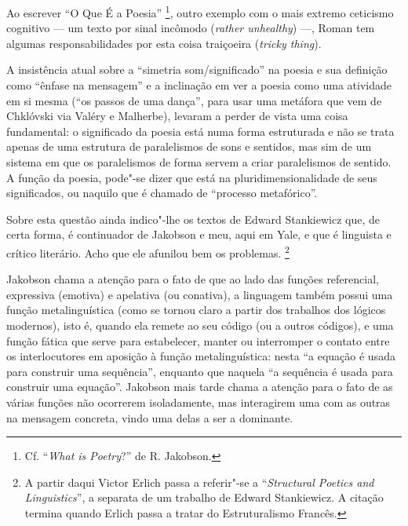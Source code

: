 Ao escrever ``O Que É a Poesia'' \footnote{Cf. ``\emph{What is
  Poetry}?'' de R. Jakobson.}, outro exemplo com o mais extremo
ceticismo cognitivo --- um texto por sinal incômodo (\emph{rather
unhealthy}) ---, Roman tem algumas responsabilidades por esta coisa
traiçoeira (\emph{tricky thing}).

A insistência atual sobre a ``simetria som/significado'' na poesia e sua
definição como ``ênfase na mensagem'' e a inclinação em ver a poesia
como uma atividade em si mesma (``os passos de uma dança'', para usar
uma metáfora que vem de Chklóvski via Valéry e Malherbe), levaram a
perder de vista uma coisa fundamental: o significado da poesia está numa
forma estruturada e não se trata apenas de uma estrutura de paralelismos
de sons e sentidos, mas sim de um sistema em que os paralelismos de
forma servem a criar paralelismos de sentido. A função da poesia,
pode"-se dizer que está na pluridimensionalidade de seus significados, ou
naquilo que é chamado de ``processo metafórico''.

Sobre esta questão ainda indico"-lhe os textos de Edward Stankiewicz que,
de certa forma, é continuador de Jakobson e meu, aqui em Yale, e que é
linguista e crítico literário. Acho que ele afunilou bem os problemas.
\footnote{A partir daqui Victor Erlich passa a referir"-se a
  ``\emph{Structural Poetics and Linguistics}'', a separata de um
  trabalho de Edward Stankiewicz. A citação termina quando Erlich passa
  a tratar do Estruturalismo Francês.}

Jakobson chama a atenção para o fato de que ao lado das funções
referencial, expressiva (emotiva) e apelativa (ou conativa), a linguagem
também possui uma função metalinguística (como se tornou claro a partir
dos trabalhos dos lógicos modernos), isto é, quando ela remete ao seu
código (ou a outros códigos), e uma função fática que serve para
estabelecer, manter ou interromper o contato entre os interlocutores em
aposição à função metalinguística: nesta ``a equação é usada para
construir uma sequência'', enquanto que naquela ``a sequência é usada
para construir uma equação''. Jakobson mais tarde chama a atenção para o
fato de as várias funções não ocorrerem isoladamente, mas interagirem
uma com as outras na mensagem concreta, vindo uma delas a ser a
dominante.

